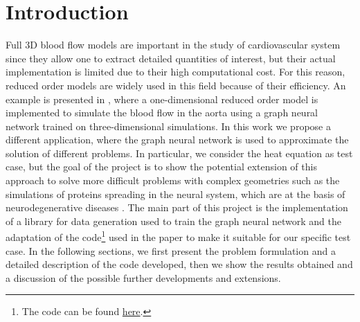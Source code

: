\documentclass[11pt,a4paper]{article}
\begin{document}




\section{Introduction}
Full 3D blood flow models are important in the study of cardiovascular system since they allow one to extract detailed quantities of interest, but their actual implementation is limited due to their high computational cost. For this reason, reduced order models are widely used in this field because of their efficiency. An example is presented in \cite{Luca}, where a one-dimensional reduced order model is implemented to simulate the blood flow in the aorta using a graph neural network trained on three-dimensional simulations. In this work we propose a different application, where the graph neural network is used to approximate the solution of different problems. In particular, we consider the heat equation as test case, but the goal of the project is to show the potential extension of this approach to solve more difficult problems with complex geometries such as the simulations of proteins spreading in the neural system, which are at the basis of neurodegenerative diseases \cite{MattiaCorti}. The main part of this project is the implementation of a library for data generation used to train the graph neural network and the adaptation of the code\footnote{The code can be found \href{https://github.com/StanfordCBCL/gROM}{here}.} used in the paper\cite{Luca} to make it suitable for our specific test case. In the following sections, we first present the problem formulation and a detailed description of the code developed, then we show the results obtained and a discussion of the possible further developments and extensions.

\end{document}
